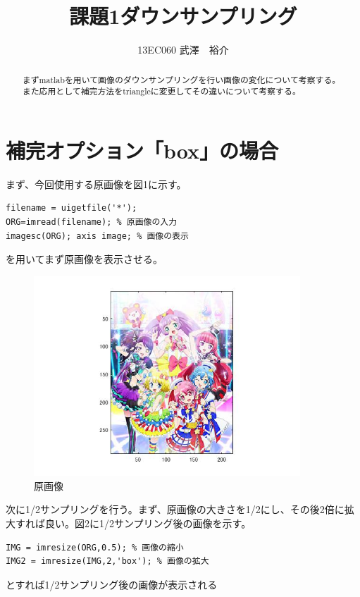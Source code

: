 \documentclass{jsarticle}
\begin{document}
\title{課題1ダウンサンプリング}
\author{13EC060 武澤　裕介}
\maketitle
\begin{abstract}
まずmatlabを用いて画像のダウンサンプリングを行い画像の変化について考察する。また応用として補完方法をtriangleに変更してその違いについて考察する。
\end{abstract}
\section{補完オプション「box」の場合}
まず、今回使用する原画像を図1に示す。
\begin{lstlisting}[basicstyle=\ttfamily\footnotesize, frame=single]
filename = uigetfile('*');
ORG=imread(filename); % 原画像の入力
imagesc(ORG); axis image; % 画像の表示
 \end{lstlisting}
を用いてまず原画像を表示させる。
\begin{figure}[htbp]
 \begin{center}
  \includegraphics[width=10cm]{kadai1-0.jpg}
 \end{center}
 \caption{原画像}
\end{figure}

次に1/2サンプリングを行う。まず、原画像の大きさを1/2にし、その後2倍に拡大すれば良い。図2に1/2サンプリング後の画像を示す。

\begin{lstlisting}[basicstyle=\ttfamily\footnotesize, frame=single]
IMG = imresize(ORG,0.5); % 画像の縮小
IMG2 = imresize(IMG,2,'box'); % 画像の拡大
 \end{lstlisting}
とすれば1/2サンプリング後の画像が表示される
\end{document}
